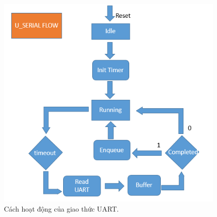 \documentclass[a4paper,12pt,oneside]{article}
\begin{document}
\begin{itemize}
\begin{itemize}
\begin{itemize}
		  	\begin{center}
			\begin{figure}[h!]
			\begin{center}
			\includegraphics[scale=.6]{hinh/uart_flow.PNG}
			\end{center}
			\caption{Cách hoạt động của giao thức UART.}
			\end{figure}
			\end{center}
					  	
		  	
		  \end{itemize}
		\end{itemize}
	\end{itemize}



\end{document}
